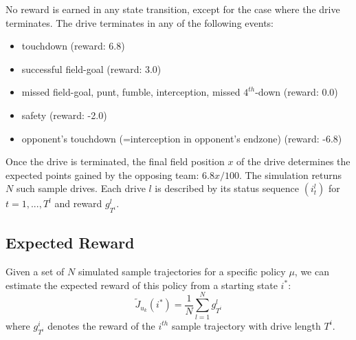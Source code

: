 \documentclass[11pt, oneside]{article}   	%
\begin{document}
No reward is earned in any state transition, except for the case where the drive terminates. The drive terminates in any of the following events:
\begin{itemize}
\item touchdown (reward: 6.8)
\item successful field-goal (reward: 3.0)
\item missed field-goal, punt, fumble, interception, missed $4^{th}$-down (reward: 0.0)
\item safety (reward: -2.0)
\item opponent's touchdown (=interception in opponent's endzone) (reward: -6.8)
\end{itemize}
Once the drive is terminated, the final field position $x$ of the drive determines the expected points gained by the opposing team: $6.8x/100$.
The simulation returns $N$ such sample drives. Each drive $l$ is described by its status sequence $(i_t^l)$ for $t=1,...,T^l$ and reward $g_{T^i}^l$.

\subsection{Expected Reward}
Given a set of $N$ simulated sample trajectories for a specific policy $\mu$, we can estimate the expected reward of this policy from a starting state $i^*$:
$$
\widetilde{J}_{u_k}(i^*) = \frac{1}{N}\sum_{l=1}^N g_{T^i}^l
$$
where $g_{T^i}^i$ denotes the reward of the $i^{th}$ sample trajectory with drive length $T^i$.
\end{document}
